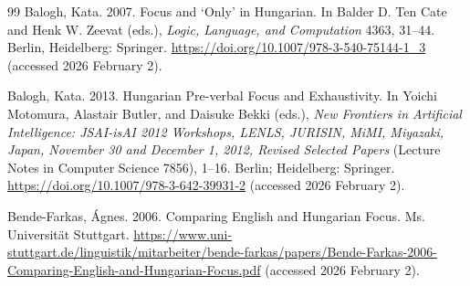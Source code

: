 \documentclass[ruler]{CUP-JNL-LIN}%
\begin{document}
\begin{Backmatter}
\begin{thebibliography}{99}
{Balogh, Kata}. 2007. Focus and `Only' in Hungarian. In Balder D. Ten Cate and Henk W. Zeevat (eds.), \textit{Logic, Language, and Computation} 4363, 31--44. Berlin, Heidelberg: Springer. \url{https://doi.org/10.1007/978-3-540-75144-1_3} (accessed 2026 February 2).



{Balogh, Kata}. 2013. Hungarian Pre-verbal Focus and Exhaustivity. In Yoichi Motomura, Alastair Butler, and Daisuke Bekki (eds.), \textit{New Frontiers in Artificial Intelligence: JSAI-isAI 2012 Workshops, LENLS, JURISIN, MiMI, Miyazaki, Japan, November 30 and December 1, 2012, Revised Selected Papers} (Lecture Notes in Computer Science 7856), 1--16. Berlin; Heidelberg: Springer. \url{https://doi.org/10.1007/978-3-642-39931-2} (accessed 2026 February 2).




{Bende-Farkas, Ágnes}. 2006. Comparing English and Hungarian Focus. Ms. Universität Stuttgart. \url{https://www.uni-stuttgart.de/linguistik/mitarbeiter/bende-farkas/papers/Bende-Farkas-2006-Comparing-English-and-Hungarian-Focus.pdf} (accessed 2026 February 2).




\end{thebibliography}
\end{Backmatter}
\end{document}
